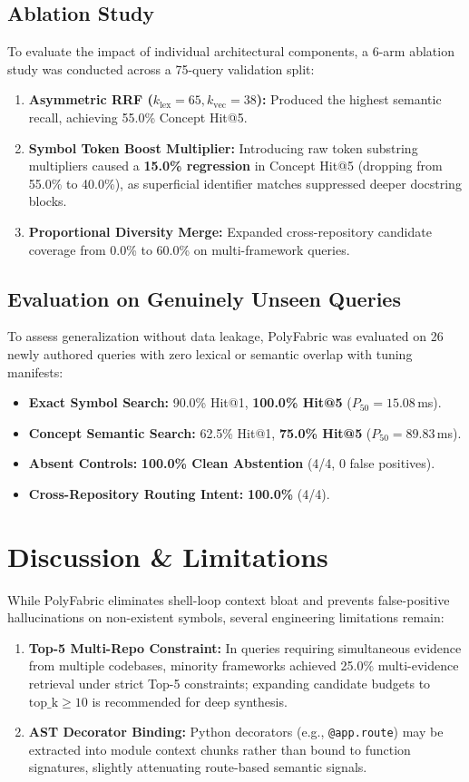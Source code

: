 \documentclass[10pt,journal,compsoc]{IEEEtran}
\begin{document}
\subsection{Ablation Study}
To evaluate the impact of individual architectural components, a 6-arm ablation study was conducted across a 75-query validation split:
\begin{enumerate}
    \item \textbf{Asymmetric RRF ($k_{\text{lex}}=65, k_{\text{vec}}=38$):} Produced the highest semantic recall, achieving 55.0\% Concept Hit@5.
    \item \textbf{Symbol Token Boost Multiplier:} Introducing raw token substring multipliers caused a \textbf{15.0\% regression} in Concept Hit@5 (dropping from 55.0\% to 40.0\%), as superficial identifier matches suppressed deeper docstring blocks.
    \item \textbf{Proportional Diversity Merge:} Expanded cross-repository candidate coverage from 0.0\% to 60.0\% on multi-framework queries.
\end{enumerate}

\subsection{Evaluation on Genuinely Unseen Queries}
To assess generalization without data leakage, PolyFabric was evaluated on 26 newly authored queries with zero lexical or semantic overlap with tuning manifests:
\begin{itemize}
    \item \textbf{Exact Symbol Search:} 90.0\% Hit@1, \textbf{100.0\% Hit@5} ($P_{50} = 15.08$\,ms).
    \item \textbf{Concept Semantic Search:} 62.5\% Hit@1, \textbf{75.0\% Hit@5} ($P_{50} = 89.83$\,ms).
    \item \textbf{Absent Controls:} \textbf{100.0\% Clean Abstention} (4/4, 0 false positives).
    \item \textbf{Cross-Repository Routing Intent:} \textbf{100.0\%} (4/4).
\end{itemize}

\section{Discussion \& Limitations}
While PolyFabric eliminates shell-loop context bloat and prevents false-positive hallucinations on non-existent symbols, several engineering limitations remain:
\begin{enumerate}
    \item \textbf{Top-5 Multi-Repo Constraint:} In queries requiring simultaneous evidence from multiple codebases, minority frameworks achieved 25.0\% multi-evidence retrieval under strict Top-5 constraints; expanding candidate budgets to $\text{top\_k} \ge 10$ is recommended for deep synthesis.
    \item \textbf{AST Decorator Binding:} Python decorators (e.g., \texttt{@app.route}) may be extracted into module context chunks rather than bound to function signatures, slightly attenuating route-based semantic signals.
\end{enumerate}
\end{document}
